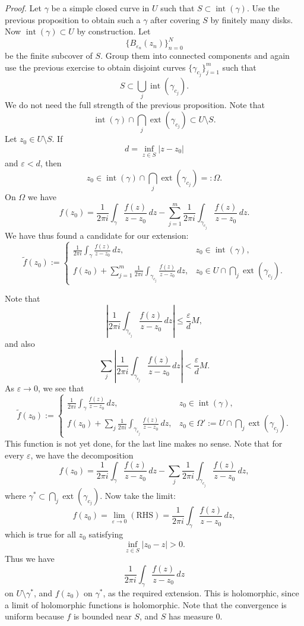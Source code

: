 \documentclass[11pt,a4paper]{article}
\begin{document}
\textit{Proof.}
Let $\gamma$ be a simple closed curve in $U$ such that \(S\subset\operatorname{int}(\gamma).\)
Use the previous proposition to obtain such a $\gamma$ after covering $S$ by finitely many disks. Now $\operatorname{int}(\gamma)\subset U$ by construction. Let
\[
  \{B_{\varepsilon_n}(z_n)\}_{n=0}^{N}
\]
be the finite subcover of $S$. Group them into connected components and again use the previous exercise to obtain disjoint curves $\{\gamma_{c_j}\}_{j=1}^{m}$ such that
\[
  S\subset\bigcup_j\operatorname{int}(\gamma_{c_j}).
\]
We do not need the full strength of the previous proposition. Note that
\[
  \operatorname{int}(\gamma)\cap\bigcap_j\operatorname{ext}(\gamma_{c_j})
  \subset U\setminus S.
\]
Let $z_0\in U\setminus S$. If
\[
  d=\inf_{z\in S}|z-z_0|
\]
and $\varepsilon<d$, then
\[
  z_0\in\operatorname{int}(\gamma)\cap\bigcap_j\operatorname{ext}(\gamma_{c_j})
  =:\Omega.
\]
On $\Omega$ we have
\[
  f(z_0)=\frac{1}{2\pi i}\int_\gamma\frac{f(z)}{z-z_0}\,dz
  -\sum_{j=1}^{m}\frac{1}{2\pi i}
  \int_{\gamma_{c_j}}\frac{f(z)}{z-z_0}\,dz.
\]
We have thus found a candidate for our extension:
\[
\widetilde f(z_0):=
\begin{cases}
\displaystyle \frac{1}{2\pi i}\int_\gamma\frac{f(z)}{z-z_0}\,dz,
  &z_0\in\operatorname{int}(\gamma),\\[1.2ex]
\displaystyle f(z_0)+\sum_{j=1}^{m}\frac{1}{2\pi i}
  \int_{\gamma_{c_j}}\frac{f(z)}{z-z_0}\,dz,
  &z_0\in U\cap\bigcap_j\operatorname{ext}(\gamma_{c_j}).
\end{cases}
\]

Note that
\[
  \left|\frac{1}{2\pi i}\int_{\gamma_{c_j}}
  \frac{f(z)}{z-z_0}\,dz\right|
  \le \frac{\varepsilon}{d}M,
\]
and also
\[
  \sum_j\left|\frac{1}{2\pi i}\int_{\gamma_{c_j}}
  \frac{f(z)}{z-z_0}\,dz\right|
  <\frac{\varepsilon}{d}M.
\]
As $\varepsilon\to0$, we see that
\[
\widetilde f(z_0):=
\begin{cases}
\displaystyle \frac{1}{2\pi i}\int_\gamma\frac{f(z)}{z-z_0}\,dz,
  &z_0\in\operatorname{int}(\gamma),\\[1.2ex]
\displaystyle f(z_0)+\sum_j\frac{1}{2\pi i}
  \int_{\gamma_{c_j}}\frac{f(z)}{z-z_0}\,dz,
  &z_0\in\Omega':=U\cap\bigcap_j\operatorname{ext}(\gamma_{c_j}).
\end{cases}
\]
This function is not yet done, for the last line makes no sense. Note that for every $\varepsilon$, we have the decomposition
\[
  f(z_0)=\frac{1}{2\pi i}\int_\gamma\frac{f(z)}{z-z_0}\,dz
  -\sum_j\frac{1}{2\pi i}
  \int_{\gamma_{c_j}}\frac{f(z)}{z-z_0}\,dz,
\]
where $\gamma^*\subset\bigcap_j\operatorname{ext}(\gamma_{c_j})$. Now take the limit:
\[
  f(z_0)=\lim_{\varepsilon\to0}(\mathrm{RHS})
  =\frac{1}{2\pi i}\int_\gamma\frac{f(z)}{z-z_0}\,dz,
\]
which is true for all $z_0$ satisfying
\[
  \inf_{z\in S}|z_0-z|>0.
\]
Thus we have
\[
  \frac{1}{2\pi i}\int_\gamma\frac{f(z)}{z-z_0}\,dz
\]
on $U\setminus\gamma^*$, and $f(z_0)$ on $\gamma^*$, as the required extension. This is holomorphic, since a limit of holomorphic functions is holomorphic. Note that the convergence is uniform because $f$ is bounded near $S$, and $S$ has measure $0$.
\end{document}
